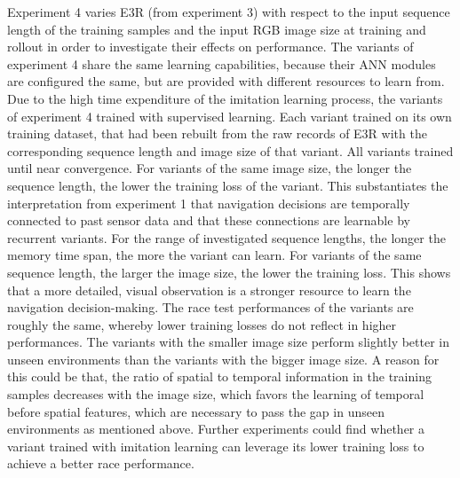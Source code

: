 Experiment 4 varies E3R (from experiment 3)
with respect to the input sequence length of the training samples
and the input RGB image size at training and rollout
in order to investigate their effects on performance.
The variants of experiment 4 
share the same learning capabilities, because their ANN modules are configured the same,
but are provided with different resources to learn from.
Due to the high time expenditure of the imitation learning process, 
the variants of experiment 4 trained with supervised learning.
Each variant trained on its own training dataset,
that had been rebuilt from the raw records of E3R 
with the corresponding sequence length and image size of that variant.
All variants trained until near convergence.
For variants of the same image size,
the longer the sequence length,
the lower the training loss of the variant.
This substantiates the interpretation from experiment 1
that navigation decisions are temporally connected to past sensor data
and that these connections are learnable by recurrent variants.
For the range of investigated sequence lengths,
the longer the memory time span,
the more the variant can learn.
For variants of the same sequence length,
the larger the image size, the lower the training loss.
This shows that a more detailed, visual observation 
is a stronger resource to learn the navigation decision-making.
The race test performances of the variants are roughly the same,
whereby lower training losses do not reflect in higher performances.
The variants with the smaller image size perform 
slightly better in unseen environments than the 
variants with the bigger image size.
A reason for this could be that, the ratio
of spatial to temporal information in the training samples
decreases with the image size,
which favors the learning of temporal before spatial features,
which are necessary to pass the gap in unseen environments as mentioned above.
Further experiments
could find whether a variant
trained with imitation learning
can leverage its lower training loss
to achieve a better race performance.


































